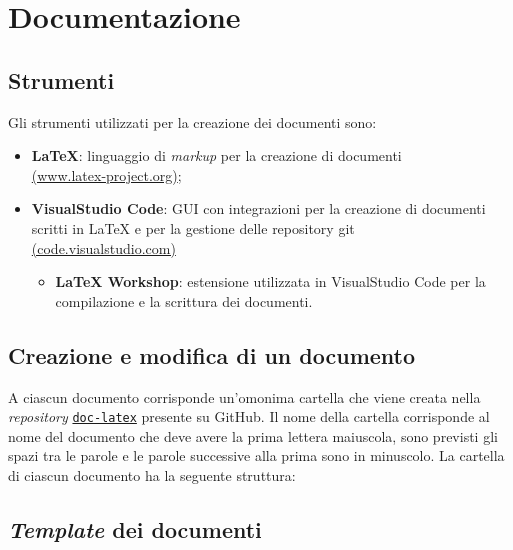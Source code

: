 \section{Documentazione}
\subsection{Strumenti}
Gli strumenti utilizzati per la creazione dei documenti sono:
\begin{itemize}
	\item \textbf{LaTeX}: linguaggio di \textit{markup} per la creazione di documenti \\
	      \href{https://www.latex-project.org/}{(www.latex-project.org)};
	\item \textbf{VisualStudio Code}: GUI con integrazioni per la creazione di documenti scritti in LaTeX e per la gestione delle repository git \\
	      \href{https://code.visualstudio.com/}{(code.visualstudio.com)}
	      \begin{itemize}
		      \item \textbf{LaTeX Workshop}: estensione utilizzata in VisualStudio Code per la compilazione e la scrittura dei documenti.
	      \end{itemize}
\end{itemize}


\subsection{Creazione e modifica di un documento}

A ciascun documento corrisponde un'omonima cartella che viene creata nella
\textit{repository}
\href{https://github.com/Project-SWEnergy/doc-latex}{\texttt{doc-latex}}
presente su GitHub. Il nome della cartella corrisponde al nome del documento che
deve avere la prima lettera maiuscola, sono previsti gli spazi tra le parole e
le parole successive alla prima sono in minuscolo.
La cartella di ciascun documento ha la seguente struttura:


\subsection{\textit{Template} dei documenti}

